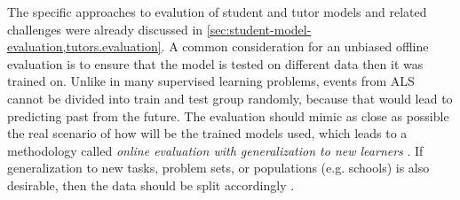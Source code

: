 
The specific approaches to evalution of student and tutor models and related challenges
were already discussed in \cref{sec:student-model-evaluation,tutors.evaluation}.
A common consideration for an unbiased offline evaluation is to ensure that
the model is tested on different data then it was trained on.
Unlike in many supervised learning problems, events from ALS
cannot be divided into train and test group randomly, because that would lead
to predicting past from the future. %
The evaluation should mimic as close as possible the real scenario of how will be
the trained models used, which leads to a methodology called \emph{online
evaluation with generalization to new learners} \cite{pelanek-learner-modeling}.
If generalization to new tasks, problem sets, or populations (e.g. schools)
is also desirable, then the data should be split accordingly \cite{student-models-review-2012}.


%

